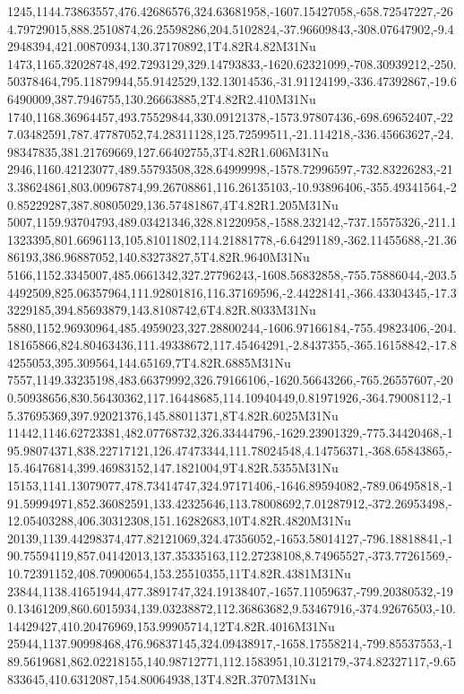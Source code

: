1245,1144.73863557,476.42686576,324.63681958,-1607.15427058,-658.72547227,-264.79729015,888.2510874,26.25598286,204.5102824,-37.96609843,-308.07647902,-9.42948394,421.00870934,130.37170892,1T4.82R4.82M31Nu
1473,1165.32028748,492.7293129,329.14793833,-1620.62321099,-708.30939212,-250.50378464,795.11879944,55.9142529,132.13014536,-31.91124199,-336.47392867,-19.66490009,387.7946755,130.26663885,2T4.82R2.410M31Nu
1740,1168.36964457,493.75529844,330.09121378,-1573.97807436,-698.69652407,-227.03482591,787.47787052,74.28311128,125.72599511,-21.114218,-336.45663627,-24.98347835,381.21769669,127.66402755,3T4.82R1.606M31Nu
2946,1160.42123077,489.55793508,328.64999998,-1578.72996597,-732.83226283,-213.38624861,803.00967874,99.26708861,116.26135103,-10.93896406,-355.49341564,-20.85229287,387.80805029,136.57481867,4T4.82R1.205M31Nu
5007,1159.93704793,489.03421346,328.81220958,-1588.232142,-737.15575326,-211.11323395,801.6696113,105.81011802,114.21881778,-6.64291189,-362.11455688,-21.3686193,386.96887052,140.83273827,5T4.82R.9640M31Nu
5166,1152.3345007,485.0661342,327.27796243,-1608.56832858,-755.75886044,-203.54492509,825.06357964,111.92801816,116.37169596,-2.44228141,-366.43304345,-17.33229185,394.85693879,143.8108742,6T4.82R.8033M31Nu
5880,1152.96930964,485.4959023,327.28800244,-1606.97166184,-755.49823406,-204.18165866,824.80463436,111.49338672,117.45464291,-2.8437355,-365.16158842,-17.84255053,395.309564,144.65169,7T4.82R.6885M31Nu
7557,1149.33235198,483.66379992,326.79166106,-1620.56643266,-765.26557607,-200.50938656,830.56430362,117.16448685,114.10940449,0.81971926,-364.79008112,-15.37695369,397.92021376,145.88011371,8T4.82R.6025M31Nu
11442,1146.62723381,482.07768732,326.33444796,-1629.23901329,-775.34420468,-195.98074371,838.22717121,126.47473344,111.78024548,4.14756371,-368.65843865,-15.46476814,399.46983152,147.1821004,9T4.82R.5355M31Nu
15153,1141.13079077,478.73414747,324.97171406,-1646.89594082,-789.06495818,-191.59994971,852.36082591,133.42325646,113.78008692,7.01287912,-372.26953498,-12.05403288,406.30312308,151.16282683,10T4.82R.4820M31Nu
20139,1139.44298374,477.82121069,324.47356052,-1653.58014127,-796.18818841,-190.75594119,857.04142013,137.35335163,112.27238108,8.74965527,-373.77261569,-10.72391152,408.70900654,153.25510355,11T4.82R.4381M31Nu
23844,1138.41651944,477.3891747,324.19138407,-1657.11059637,-799.20380532,-190.13461209,860.6015934,139.03238872,112.36863682,9.53467916,-374.92676503,-10.14429427,410.20476969,153.99905714,12T4.82R.4016M31Nu
25944,1137.90998468,476.96837145,324.09438917,-1658.17558214,-799.85537553,-189.5619681,862.02218155,140.98712771,112.1583951,10.312179,-374.82327117,-9.65833645,410.6312087,154.80064938,13T4.82R.3707M31Nu
